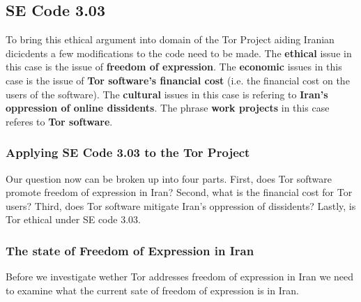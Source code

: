 \documentclass[11pt]{article}
\begin{document}
\begin{multicols}{2}
\subsection{SE Code 3.03}

\newline

To bring this ethical argument into domain of the Tor Project
aiding Iranian dicicdents a few modifications to the code need to be made. The
\textbf{ethical} issue in this case is the issue of \textbf{freedom of
expression}. The \textbf{economic} issues in this case is the issue of
\textbf{Tor software's financial cost} (i.e. the financial cost on the users of
the software). The \textbf{cultural} issues in this case is refering to
\textbf{Iran's oppression of online dissidents}. The phrase \textbf{work projects} in
this case referes to \textbf{Tor software}.


\subsubsection{Applying SE Code 3.03 to the Tor Project}

\newline

Our question now can be broken up into four parts. First, does Tor software
promote freedom of expression in Iran? Second, what is the financial cost for
Tor users?  Third, does Tor software mitigate Iran's oppression of dissidents?
Lastly, is Tor ethical under SE code 3.03.

\subsubsection{The state of Freedom of Expression in Iran}
Before we investigate wether Tor addresses freedom of expression in Iran we need
to examine what the current sate of freedom of expression is in Iran. 


\end{multicols}
\end{document}
